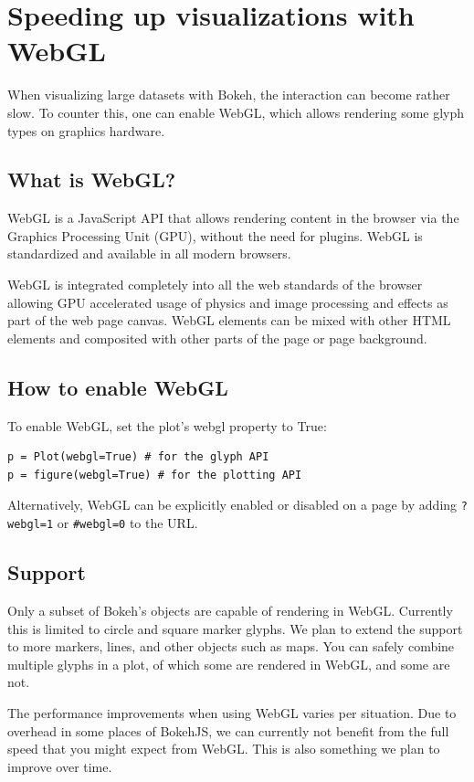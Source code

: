 \documentclass[a4paper,12pt]{article}
\begin{document}
	\large
	\section{Speeding up visualizations with WebGL}
When visualizing large datasets with Bokeh, the interaction can become rather slow. To counter this, one can enable WebGL, which allows rendering some glyph types on graphics hardware.

\subsection{What is WebGL?}
WebGL is a JavaScript API that allows rendering content in the browser via the Graphics Processing Unit (GPU), without the need for plugins. WebGL is standardized and available in all modern browsers.

WebGL is integrated completely into all the web standards of the browser allowing GPU accelerated usage of physics and image processing and effects as part of the web page canvas. WebGL elements can be mixed with other HTML elements and composited with other parts of the page or page background.

\subsection{How to enable WebGL}
To enable WebGL, set the plot’s webgl property to True:

\begin{framed}
\begin{verbatim}
p = Plot(webgl=True) # for the glyph API 
p = figure(webgl=True) # for the plotting API
\end{verbatim}
\end{framed}
Alternatively, WebGL can be explicitly enabled or disabled on a page by adding \texttt{?webgl=1} or \texttt{\#webgl=0} to the URL.

\subsection{Support}
Only a subset of Bokeh’s objects are capable of rendering in WebGL. Currently this is limited to circle and square marker glyphs. We plan to extend the support to more markers, lines, and other objects such as maps. You can safely combine multiple glyphs in a plot, of which some are rendered in WebGL, and some are not.

The performance improvements when using WebGL varies per situation. Due to overhead in some places of BokehJS, we can currently not benefit from the full speed that you might expect from WebGL. This is also something we plan to improve over time.
\end{document}
